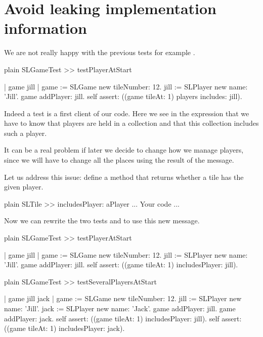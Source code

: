 \documentclass[10pt,twoside,english]{_support/latex/sbabook/sbabook}
\begin{document}
\section{Avoid leaking implementation information}
We are not really happy with the previous tests for example .

\begin{displaycode}{plain}
SLGameTest >> testPlayerAtStart

	| game jill |
	game := SLGame new tileNumber: 12.
	jill := SLPlayer new name: 'Jill'.
	game addPlayer: jill. 
	self assert: ((game tileAt: 1) players includes: jill).
\end{displaycode}

Indeed a test is a first client of our code. Here we see in the expression   that we have to know that players are held in a collection and that this collection includes such a player.

It can be a real problem if later we decide to change how we manage players,
since we will have to change all the places using the result of the  message. 

Let us address this issue: define a method  that returns whether a tile has the given player.

\begin{displaycode}{plain}
SLTile >> includesPlayer: aPlayer
	... Your code ...
\end{displaycode}

 
Now we can rewrite the two tests  and  to use this new message. 

\begin{displaycode}{plain}
SLGameTest >> testPlayerAtStart

	| game jill |
	game := SLGame new tileNumber: 12.
	jill := SLPlayer new name: 'Jill'.
	game addPlayer: jill. 
	self assert: ((game tileAt: 1) includesPlayer: jill).
\end{displaycode}

\begin{displaycode}{plain}
SLGameTest >> testSeveralPlayersAtStart

	| game jill jack |
	game := SLGame new tileNumber: 12.
	jill := SLPlayer new name: 'Jill'.
	jack := SLPlayer new name: 'Jack'.
	game addPlayer: jill.
	game addPlayer: jack.
	self assert: ((game tileAt: 1) includesPlayer: jill).
	self assert: ((game tileAt: 1) includesPlayer: jack).
\end{displaycode}
\end{document}
